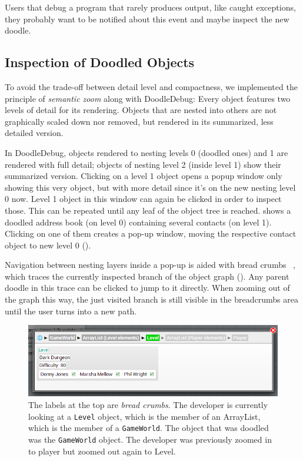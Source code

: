 \documentclass[english]{scrartcl}
\newcommand\nes[1]{\nbc{nes}{#1}{blue}}
\newcommand{\DD}{Dood\-le\-De\-bug\xspace}
\begin{document}
Users that debug a program that rarely produces output, like caught exceptions, they probably want to be notified about this event and maybe inspect the new doodle.


\subsection{Inspection of Doodled Objects}
To avoid the trade-off between detail level and compactness, we implemented the principle of \emph{semantic zoom} along with \DD:
Every object features two levels of detail for its rendering.
Objects that are nested into others are not graphically scaled down nor removed, but rendered in its summarized, less detailed  version.

In \DD, objects rendered to nesting levels 0 (doodled ones) and 1 are rendered with full detail; objects of nesting level 2 (inside level 1) show their summarized version.
Clicking on a level 1 object opens a popup window only showing this very object, but with more detail since it's on the new nesting level 0 now.
Level 1 object in this window can again be clicked in order to inspect those.
This can be repeated until any leaf of the object tree is reached.
 shows a doodled address book (on level 0) containing several contacts (on level 1). Clicking on one of them creates a pop-up window, moving the respective contact object to new level 0 ().

Navigation between nesting layers inside a pop-up is aided with bread crumbs~\cite{Krug00a} \nes{Page?}, which traces the currently inspected branch of the object graph ().
Any parent doodle in this trace can be clicked to jump to it directly.
When zooming out of the graph this way, the just visited branch is still visible in the breadcrumbs area until the user turns into a new path.

\begin{figure}[h]
	\includegraphics[width=\linewidth]{img/breadcrumbs.png}
	\caption{The labels at the top are \emph{bread crumbs}. The developer is currently looking at a \texttt{Level} object, which is the member of an ArrayList, which is the member of a \texttt{GameWorld}. The object that was doodled was the \texttt{GameWorld} object. The developer was previously zoomed in to player but zoomed out again to Level.}
\end{figure}
\end{document}
